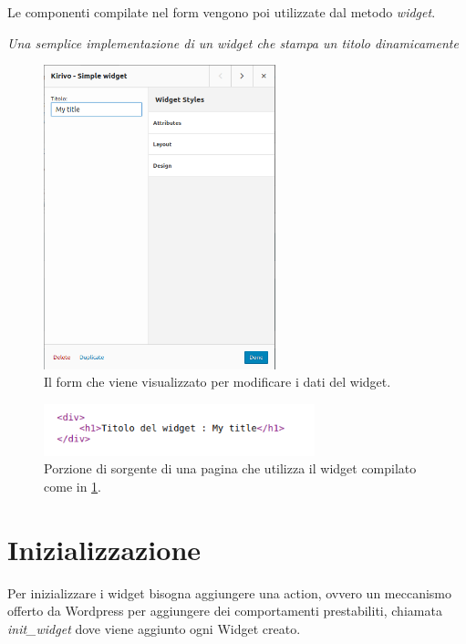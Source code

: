 Le componenti compilate nel form vengono poi utilizzate dal metodo \emph{widget}.



\emph{Una semplice implementazione di un widget che stampa un titolo dinamicamente}


\begin{figure}
  \includegraphics[width=0.6\textwidth]{figure/wid_form.png}
  \caption{Il form che viene visualizzato per modificare i dati del widget.}
  \label{fig:wform}
\end{figure}
\begin{figure}
  \includegraphics[width=0.7\textwidth]{figure/sourcewid.png}
  \caption{Porzione di sorgente di una pagina che utilizza il widget compilato come in \ref{fig:wform}.}
  \label{fig:wsource}
\end{figure}

\newpage

\section{Inizializzazione}
Per inizializzare i widget bisogna aggiungere una action\cite{WPACTION}, ovvero un meccanismo offerto da Wordpress per aggiungere dei comportamenti
prestabiliti,  chiamata \emph{init\_widget} dove viene aggiunto ogni Widget creato.

